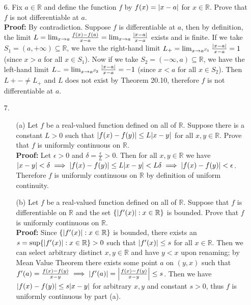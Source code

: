 \documentclass{article}
\begin{document}
\newpage
\begin{itemize}
    \item [6.] Fix $a\in\mathbb{R}$ and define the function $f$ by $f(x)=\abs{x-a}$ for $x\in\mathbb{R}$. Prove that $f$ is not differentiable at $a$.\\\textbf{Proof: } By contradiction. Suppose $f$ is differentiable at $a$, then by definition, the limit $L=\lim_{x\to a}\frac{f(x)-f(a)}{x-a}=\lim_{x\to a}\frac{\abs{x-a}}{x-a}$ exists and is finite. If we take $S_1=(a,+\infty)\subseteq\mathbb{R}$, we have the right-hand limit $L_+=\lim_{x\to a^{S_1}}\frac{\abs{x-a}}{x-a}=1$ (since $x>a$ for all $x\in S_1$). Now if we take $S_2=(-\infty,a)\subseteq\mathbb{R}$, we have the left-hand limit $L_-=\lim_{x\to a^{S_2}}\frac{\abs{x-a}}{x-a}=-1$ (since $x<a$ for all $x\in S_2$). Then $L+-\neq L_+$ and $L$ does not exist by Theorem 20.10, therefore $f$ is not differentiable at $a$.
\end{itemize}

\newpage
\begin{itemize}
    \item [7.] \begin{itemize}
              \item [(a)] Let $f$ be a real-valued function defined on all of $\mathbb{R}$. Suppose there is a constant $L>0$ such that $\abs{f(x)-f(y)}\leq L\abs{x-y}$ for all $x,y\in\mathbb{R}$. Prove that $f$ is uniformly continuous on $\mathbb{R}$.\\\textbf{Proof: } Let $\epsilon>0$ and $\delta=\frac{\epsilon}{L}>0$. Then for all $x,y\in\mathbb{R}$ we have $\abs{x-y}<\delta\implies \abs{f(x)-f(y)}\leq L\abs{x-y}<L\delta\implies \abs{f(x)-f(y)}<\epsilon$. Therefore $f$ is uniformly continuous on $\mathbb{R}$ by definition of uniform continuity.
              \item [(b)] Let $f$ be a real-valued function defined on all of $\mathbb{R}$. Suppose that $f$ is differentiable on $\mathbb{R}$ and the set $\{\abs{f'(x)}:x\in\mathbb{R}\}$ is bounded. Prove that $f$ is uniformly continuous on $\mathbb{R}$.\\\textbf{Proof: } Since $\{\abs{f'(x)}:x\in\mathbb{R}\}$ is bounded, there exists an $s=\sup\{\abs{f'(x)}:x\in\mathbb{R}\}>0$ such that $\abs{f'(x)}\leq s$ for all $x\in\mathbb{R}$. Then we can select arbitrary distinct $x,y\in\mathbb{R}$ and have $y<x$ upon renaming; by Mean Value Theorem there exists some point $a$ on $(y,x)$ such that $f'(a)=\frac{f(x)-f(y)}{x-y}\implies \abs{f'(a)}=\abs{\frac{f(x)-f(y)}{x-y}}\leq s$. Then we have $\abs{f(x)-f(y)}\leq s\abs{x-y}$ for arbitrary $x,y$ and constant $s>0$, thus $f$ is uniformly continuous by part (a).
          \end{itemize}
\end{itemize}
\end{document}
